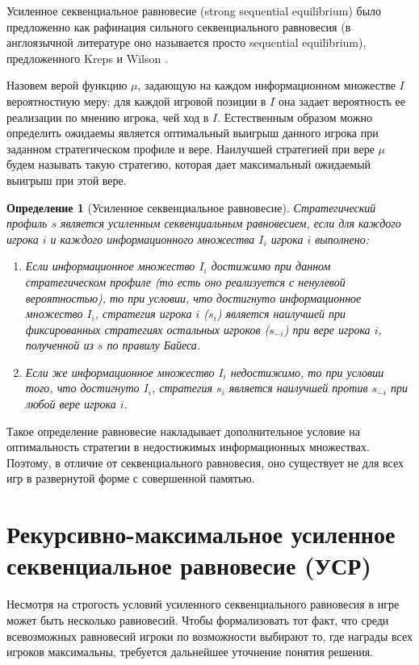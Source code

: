 \documentclass[14pt, a4paper, russian]{report}
\newtheorem{definition}{\indent Определение}
\begin{document}
        Усиленное секвенциальное равновесие (strong sequential equilibrium) было предложенно как рафинация сильного секвенциального равновесия (в англоязычной литературе оно называется просто sequential equilibrium), предложенного Kreps и Wilson \cite{kreps1982sequential}.

        Назовем верой функцию $\mu$, задающую на каждом информационном множестве $I$ вероятностную меру: для каждой игровой позиции в $I$ она задает вероятность ее реализации по мнению игрока, чей ход в $I$. Естественным образом можно определить ожидаемы является оптимальный выигрыш данного игрока при заданном стратегическом профиле и вере. Наилучшей стратегией при вере $\mu$ будем называть такую стратегию, которая дает максимальный ожидаемый выигрыш при этой вере.
        \begin{definition}[Усиленное секвенциальное равновесие]
            Стратегический профиль $s$ является усиленным секвенциальным равновесием, если для каждого игрока $i$ и каждого информационного множества $I_i$ игрока $i$ выполнено:

            \begin{enumerate}
                \item Если информационное множество $I_i$ достижимо при данном стратегическом профиле (то есть оно реализуется с ненулевой вероятностью), то при условии, что достигнуто информационное множество $I_i$, стратегия игрока $i$ ($s_i$) является наилучшей при фиксированных стратегиях остальных игроков ($s_{-i}$) при вере игрока $i$, полученной из $s$ по правилу Байеса.
                \item Если же информационное множество $I_i$ недостижимо, то при условии того, что достигнуто $I_i$, стратегия $s_i$ является наилучшей против $s_{-i}$ при любой вере игрока $i$.
            \end{enumerate}
        \end{definition}

        Такое определение равновесие накладывает дополнительное условие на оптимальность стратегии в недостижимых информационных множествах. Поэтому, в отличие от секвенциального равновесия, оно существует не для всех игр в развернутой форме с совершенной памятью.

        \section{Рекурсивно-максимальное усиленное секвенциальное равновесие (УСР)}

        Несмотря на строгость условий усиленного секвенциального равновесия в игре может быть несколько равновесий. Чтобы формализовать тот факт, что среди всевозможных равновесий игроки по возможности выбирают то, где награды всех игроков максимальны, требуется дальнейшее уточнение понятия решения.
\end{document}
